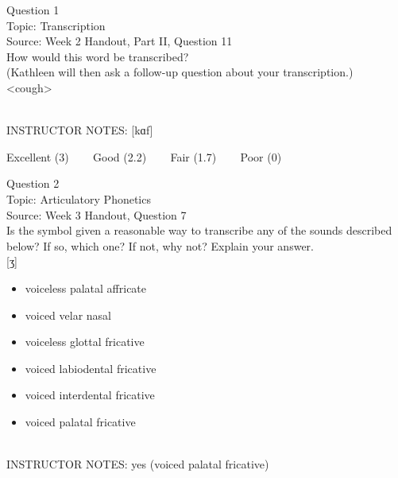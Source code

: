 \documentclass[12pt]{article}
\begin{document}
\begin{center}
\textbf{{\color{blue}{\HUGE START OF EXAM\\}}}

\textbf{{\color{blue}{\HUGE Student ID: 27762\\}}}

\textbf{{\color{blue}{\HUGE \\}}}

\end{center}
\newpage

{\large Question 1}\\

Topic: Transcription\\
Source: Week 2 Handout, Part II, Question 11\\

How would this word be transcribed?\\ (Kathleen will then ask a follow-up question about your transcription.)\\

<cough>


~\\
INSTRUCTOR NOTES: [kɑf]


\vfill
Excellent (3) ~~~ Good (2.2) ~~~ Fair (1.7) ~~~ Poor (0)
\newpage

{\large Question 2}\\

Topic: Articulatory Phonetics\\
Source: Week 3 Handout, Question 7\\

Is the symbol given a reasonable way to transcribe any of the sounds described below? If so, which one? If not, why not? Explain your answer.\\

{[ʒ]}

\begin{itemize} \item voiceless palatal affricate \item voiced velar nasal \item voiceless glottal fricative \item voiced labiodental fricative \item voiced interdental fricative \item voiced palatal fricative \end{itemize}


~\\
INSTRUCTOR NOTES: yes (voiced palatal fricative)
\end{document}

